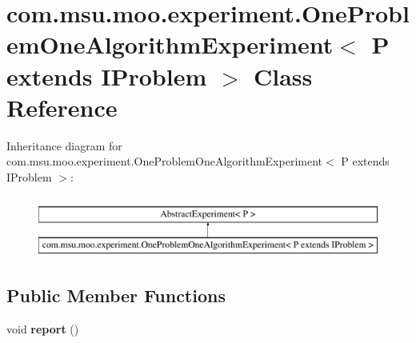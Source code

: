 \hypertarget{classcom_1_1msu_1_1moo_1_1experiment_1_1OneProblemOneAlgorithmExperiment_3_01P_01extends_01IProblem_01_4}{\section{com.\-msu.\-moo.\-experiment.\-One\-Problem\-One\-Algorithm\-Experiment$<$ P extends I\-Problem $>$ Class Reference}
\label{classcom_1_1msu_1_1moo_1_1experiment_1_1OneProblemOneAlgorithmExperiment_3_01P_01extends_01IProblem_01_4}
}
Inheritance diagram for com.\-msu.\-moo.\-experiment.\-One\-Problem\-One\-Algorithm\-Experiment$<$ P extends I\-Problem $>$\-:\begin{figure}[H]
\begin{center}
\leavevmode
\includegraphics[height=2.000000cm]{classcom_1_1msu_1_1moo_1_1experiment_1_1OneProblemOneAlgorithmExperiment_3_01P_01extends_01IProblem_01_4}
\end{center}
\end{figure}
\subsection*{Public Member Functions}
\begin{DoxyCompactItemize}
\item 
\hypertarget{classcom_1_1msu_1_1moo_1_1experiment_1_1OneProblemOneAlgorithmExperiment_3_01P_01extends_01IProblem_01_4_a27714412a54115a1383557a614a87e8b}{void {\bfseries report} ()}\label{classcom_1_1msu_1_1moo_1_1experiment_1_1OneProblemOneAlgorithmExperiment_3_01P_01extends_01IProblem_01_4_a27714412a54115a1383557a614a87e8b}

\end{DoxyCompactItemize}
